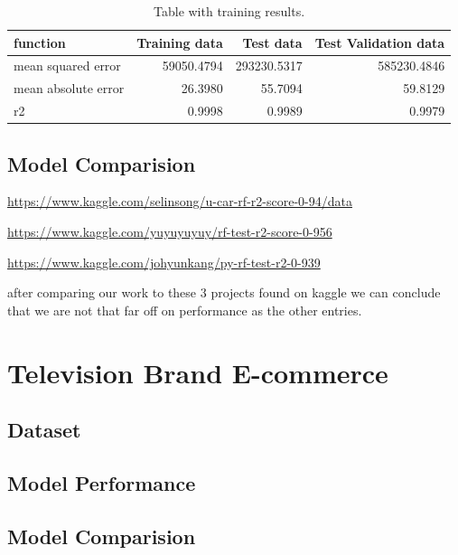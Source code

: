 \begin{table}[h!]
    \begin{center}
        \caption{Table with training results.}
        \label{tab:training results}
        \begin{tabular}{l|r|r|r} %
            \textbf{function} & \textbf{Training data} & \textbf{Test data} & \textbf{Test Validation data}\\
            \hline
            mean squared error & 59050.4794 & 293230.5317 & 585230.4846\\
            mean absolute error & 26.3980 & 55.7094 & 59.8129\\
            r2 & 0.9998 & 0.9989 & 0.9979\\
        \end{tabular}
    \end{center}
\end{table}

\subsection{Model Comparision}


\url{https://www.kaggle.com/selinsong/u-car-rf-r2-score-0-94/data}

\url{https://www.kaggle.com/yuyuyuyuy/rf-test-r2-score-0-956}

\url{https://www.kaggle.com/johyunkang/py-rf-test-r2-0-939}

after comparing our work to these 3 projects found on kaggle we can conclude that we are not that far off on performance as the other entries.
\section{Television Brand E-commerce}
\lipsum[2-2]

\subsection{Dataset}
\lipsum[2-2]

\subsection{Model Performance}
\lipsum[2-2]

\subsection{Model Comparision}
\lipsum[2-2]
